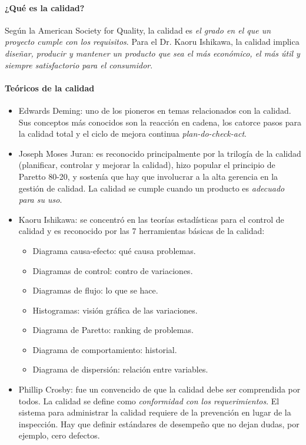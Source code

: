 \documentclass[a4paper,twosides]{article}
\newlength{\wideitemsep}
\let\olditem\item
\renewcommand{\item}{\setlength{\itemsep}{\wideitemsep}\olditem}
\begin{document}
\paragraph{¿Qué es la calidad?} Según la American Society for Quality, la calidad es \emph{el grado en el que un proyecto cumple con los requisitos}. Para el Dr. Kaoru Ishikawa, la calidad implica \emph{diseñar, producir y mantener un producto que sea el más económico, el más útil y siempre satisfactorio para el consumidor}.

\paragraph{Teóricos de la calidad}
\begin{itemize}
\item Edwards Deming: uno de los pioneros en temas relacionados con la calidad. Sus conceptos más conocidos son la reacción en cadena, los catorce pasos para la calidad total y el ciclo de mejora continua \emph{plan-do-check-act}.
\item Joseph Moses Juran: es reconocido principalmente por la trilogía de la calidad (planificar, controlar y mejorar la calidad), hizo popular el principio de Paretto 80-20, y sostenía que hay que involucrar a la alta gerencia en la gestión de calidad. La calidad se cumple cuando un producto es \emph{adecuado para su uso}.
\item Kaoru Ishikawa: se concentró en las teorías estadísticas para el control de calidad y es reconocido por las 7 herramientas básicas de la calidad:
\begin{itemize}
\item Diagrama causa-efecto: qué causa problemas.
\item Diagramas de control: contro de variaciones.
\item Diagramas de flujo: lo que se hace.
\item Histogramas: visión gráfica de las variaciones.
\item Diagrama de Paretto: ranking de problemas.
\item Diagrama de comportamiento: historial.
\item Diagrama de dispersión: relación entre variables.
\end{itemize}
\item Phillip Crosby: fue un convencido de que la calidad debe ser comprendida por todos. La calidad se define como \emph{conformidad con los requerimientos}. El sistema para administrar la calidad requiere de la prevención en lugar de la inspección. Hay que definir estándares de desempeño que no dejan dudas, por ejemplo, cero defectos.
\end{itemize}
\end{document}
